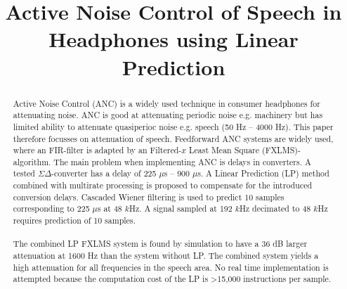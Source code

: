\documentclass[conference]{IEEEtran}
\begin{document}
\title{Active Noise Control of Speech in Headphones using Linear Prediction}

\author{
}

\maketitle

\begin{abstract}
Active Noise Control (ANC) is a widely used technique in consumer headphones for attenuating noise. ANC is good at attenuating periodic noise e.g. machinery but has limited ability to attenuate quasiperioc noise e.g. speech (50 Hz -- 4000 Hz). This paper therefore focusses on attenuation of speech. Feedforward ANC systems are widely used, where an FIR-filter is adapted by an Filtered-$x$ Least Mean Square (FXLMS)-algorithm. The main problem when implementing ANC is delays in converters. A tested $\Sigma\Delta$-converter has a delay of 225 $\mu$s -- 900 $\mu$s. A Linear Prediction (LP) method combined with multirate processing is proposed to compensate for the introduced conversion delays. Cascaded Wiener filtering is used to predict 10 samples corresponding to 225 $\mu$s at 48 $k$Hz. A signal sampled at 192 $k$Hz decimated to 48 $k$Hz requires prediction of 10 samples.  
\\\\
The combined LP FXLMS system is found by simulation to have a 36 dB larger attenuation at 1600 Hz than the system without LP. The combined system yields a high attenuation for all frequencies in the speech area. No real time implementation is attempted because the computation cost of the LP is >15,000 instructions per sample. %
	

\end{abstract}
\end{document}
